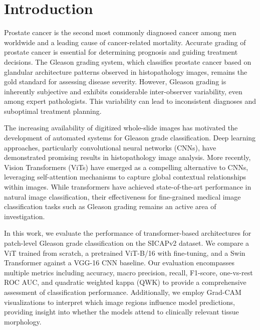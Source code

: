 \documentclass[conference]{IEEEtran}
\begin{document}

\section{\textbf{Introduction}}

Prostate cancer is the second most commonly diagnosed cancer among men worldwide and a leading cause of cancer-related mortality. Accurate grading of prostate cancer is essential for determining prognosis and guiding treatment decisions. The Gleason grading system, which classifies prostate cancer based on glandular architecture patterns observed in histopathology images, remains the gold standard for assessing disease severity. However, Gleason grading is inherently subjective and exhibits considerable inter-observer variability, even among expert pathologists. This variability can lead to inconsistent diagnoses and suboptimal treatment planning.

The increasing availability of digitized whole-slide images has motivated the development of automated systems for Gleason grade classification. Deep learning approaches, particularly convolutional neural networks (CNNs), have demonstrated promising results in histopathology image analysis. More recently, Vision Transformers (ViTs) have emerged as a compelling alternative to CNNs, leveraging self-attention mechanisms to capture global contextual relationships within images. While transformers have achieved state-of-the-art performance in natural image classification, their effectiveness for fine-grained medical image classification tasks such as Gleason grading remains an active area of investigation.

In this work, we evaluate the performance of transformer-based architectures for patch-level Gleason grade classification on the SICAPv2 dataset. We compare a ViT trained from scratch, a pretrained ViT-B/16 with fine-tuning, and a Swin Transformer against a VGG-16 CNN baseline. Our evaluation encompasses multiple metrics including accuracy, macro precision, recall, F1-score, one-vs-rest ROC AUC, and quadratic weighted kappa (QWK) to provide a comprehensive assessment of classification performance. Additionally, we employ Grad-CAM visualizations to interpret which image regions influence model predictions, providing insight into whether the models attend to clinically relevant tissue morphology.
\end{document}

